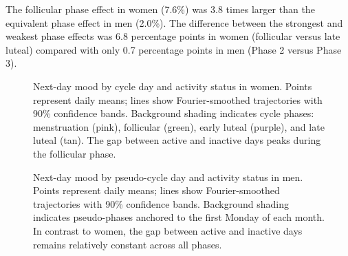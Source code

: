 \documentclass[12pt]{article}
\begin{document}
The follicular phase effect in women (7.6\%) was 3.8 times larger than the equivalent phase effect in men (2.0\%). The difference between the strongest and weakest phase effects was 6.8 percentage points in women (follicular versus late luteal) compared with only 0.7 percentage points in men (Phase 2 versus Phase 3).

\begin{figure}[htbp]
\centering
\caption{Next-day mood by cycle day and activity status in women. Points represent daily means; lines show Fourier-smoothed trajectories with 90\% confidence bands. Background shading indicates cycle phases: menstruation (pink), follicular (green), early luteal (purple), and late luteal (tan). The gap between active and inactive days peaks during the follicular phase.}
\label{fig:women}
\end{figure}

\begin{figure}[htbp]
\centering
\caption{Next-day mood by pseudo-cycle day and activity status in men. Points represent daily means; lines show Fourier-smoothed trajectories with 90\% confidence bands. Background shading indicates pseudo-phases anchored to the first Monday of each month. In contrast to women, the gap between active and inactive days remains relatively constant across all phases.}
\label{fig:men}
\end{figure}
\end{document}
